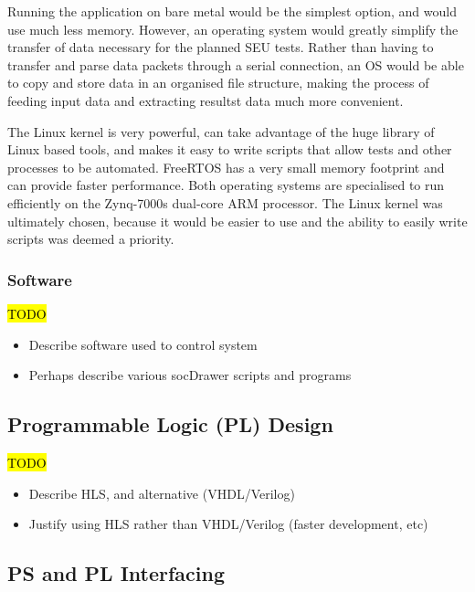 \documentclass[12pt]{article}
\begin{document}
Running the application on bare metal would be the simplest option, and would use much less memory. However, an operating system would greatly simplify the transfer of data necessary for the planned SEU tests. Rather than having to transfer and parse data packets through a serial connection, an OS would be able to copy and store data in an organised file structure, making the process of feeding input data and extracting resultst data much more convenient.

The Linux kernel is very powerful, can take advantage of the huge library of Linux based tools, and makes it easy to write scripts that allow tests and other processes to be automated. FreeRTOS has a very small memory footprint and can provide faster performance. Both operating systems are specialised to run efficiently on the Zynq-7000s dual-core ARM processor. The Linux kernel was ultimately chosen, because it would be easier to use and the ability to easily write scripts was deemed a priority.

\subsubsection{Software}
\label{sec:Design-PS-SW}

\hl{TODO}

\begin{itemize}
\item Describe software used to control system
\item Perhaps describe various socDrawer scripts and programs
\end{itemize}

\subsection{Programmable Logic (PL) Design}
\label{sec:Design-PL}


\hl{TODO}

\begin{itemize}
\item Describe HLS, and alternative (VHDL/Verilog)
\item Justify using HLS rather than VHDL/Verilog (faster development, etc)
\end{itemize}

\subsection{PS and PL Interfacing}
\label{sec:Design-PSnPL}
\end{document}

